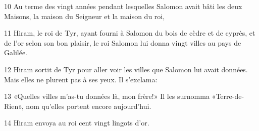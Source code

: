 
10 Au terme des vingt années pendant lesquelles Salomon avait bâti les deux Maisons, la maison du Seigneur et la maison du roi,

11 Hiram, le roi de Tyr, ayant fourni à Salomon du bois de cèdre et de cyprès, et de l’or selon son bon plaisir, le roi Salomon lui donna vingt villes au pays de Galilée.

12 Hiram sortit de Tyr pour aller voir les villes que Salomon lui avait données. Mais elles ne plurent pas à ses yeux. Il s’exclama:

13 «Quelles villes m’as-tu données là, mon frère!» Il les surnomma «Terre-de-Rien», nom qu’elles portent encore aujourd’hui.

14 Hiram envoya au roi cent vingt lingots d’or.